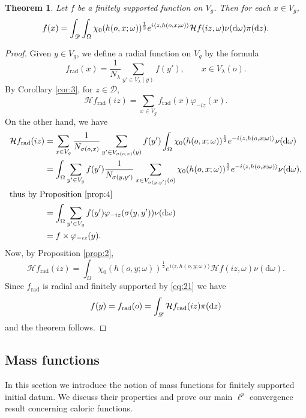 \documentclass[11pt]{amsart}
\newcommand{\calH}{\mathcal{H}}
\newcommand{\scrD}{\mathscr{D}}
\newcommand{\vphi}{\varphi}
\newcommand{\sprod}[2]{\langle {#1}, {#2} \rangle}
\theoremstyle{plain}
\newcounter{thm}
\newtheorem{theorem}{Theorem}[section]
\theoremstyle{definition}
\numberwithin{equation}{section}
\begin{document}
\begin{theorem}
	\label{thm:14}
	Let $f$ be a finitely supported function on $V_g$. Then for each $x \in V_g$,
	\[
		f(x) =
		\int_{\scrD}
		\int_{\Omega} 
		\chi_0(h(o,x; \omega))^{\frac{1}{2}}e^{i\sprod{z}{h(o, x; \omega)}}\calH f(iz, \omega)
        \nu(\mathrm{d}\omega)
		\pi({\rm d} z).
	\]
\end{theorem}
\begin{proof}
	Given $y \in V_g$, we define a radial function on $V_g$ by the formula
	\[
		f_{\text{rad}}(x) = \frac{1}{N_\lambda} \sum_{y' \in V_{\lambda}(y)} f(y'),
		\qquad x\in V_\lambda(o).
	\]
	By Corollary \ref{cor:3}, for $z \in \scrD$,
	\[
		\calH f_{\text{rad}}(i z) = \sum_{x \in V_g} f_{\text{rad}}(x) \vphi_{-i z}(x).
	\]
	On the other hand, we have
	\begin{align*}
		\calH f_{\text{rad}}(i z)
		&= \sum_{x \in V_g} \frac{1}{N_{\sigma(o, x)}} \sum_{y' \in V_{\sigma(o, x)} (y)} f(y') 
		\int_{\Omega} \chi_0(h(o, x; \omega))^{\frac12} e^{-i\sprod{z}{h(o, x; \omega)}} \nu({\rm d} \omega) \\
		&= 
		\int_{\Omega} \sum_{y' \in V_g} f(y') 
		\frac{1}{N_{\sigma(y, y')}}
		\sum_{x \in V_{\sigma(y, y')}(o)}
		\chi_0(h(o, x; \omega))^{\frac12} e^{-i\sprod{z}{h(o, x; \omega)}} \nu({\rm d} \omega), \\
	\intertext{thus by Proposition \ref{prop:4}}
		&=
		\int_{\Omega} \sum_{y' \in V_g} f(y') \vphi_{-iz}(\sigma(y, y')) \nu({\rm d} \omega) \\
		&=
		f \times \vphi_{-iz}(y).
	\end{align*}
	Now, by Proposition \ref{prop:2},
	\[
		\calH f_{\text{rad}}(iz)
		=
		\int_{\Omega} 
		\chi_0(h(o,y; \omega))^{\frac{1}{2}}e^{i\sprod{z}{h(o, y; \omega)}}\calH f(iz, \omega)
        \nu(\mathrm{d}\omega).
	\]
	Since $f_{\text{rad}}$ is radial and finitely supported by \eqref{eq:21} we have 
	\[
		f(y) = f_{\text{rad}}(o) = \int_\scrD \calH f_{\text{rad}}(iz) \pi({\rm d} z)
	\]
	and the theorem follows.
\end{proof}

\subsection{Mass functions}
\label{sec:6}
In this section we introduce the notion of mass functions for finitely supported initial datum. We discuss their properties 
and prove our main $\ell^p$ convergence result concerning caloric functions.
\end{document}
